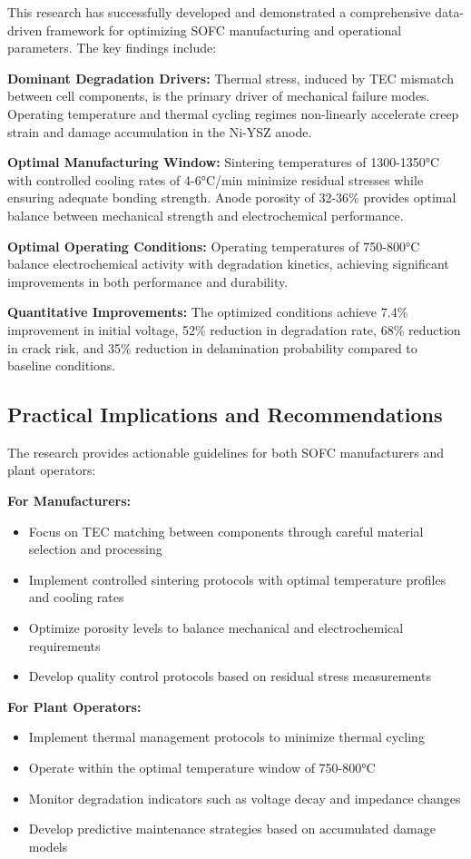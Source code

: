\documentclass[conference]{IEEEtran}
\begin{document}
This research has successfully developed and demonstrated a comprehensive data-driven framework for optimizing SOFC manufacturing and operational parameters. The key findings include:

\textbf{Dominant Degradation Drivers:} Thermal stress, induced by TEC mismatch between cell components, is the primary driver of mechanical failure modes. Operating temperature and thermal cycling regimes non-linearly accelerate creep strain and damage accumulation in the Ni-YSZ anode.

\textbf{Optimal Manufacturing Window:} Sintering temperatures of 1300-1350°C with controlled cooling rates of 4-6°C/min minimize residual stresses while ensuring adequate bonding strength. Anode porosity of 32-36\% provides optimal balance between mechanical strength and electrochemical performance.

\textbf{Optimal Operating Conditions:} Operating temperatures of 750-800°C balance electrochemical activity with degradation kinetics, achieving significant improvements in both performance and durability.

\textbf{Quantitative Improvements:} The optimized conditions achieve 7.4\% improvement in initial voltage, 52\% reduction in degradation rate, 68\% reduction in crack risk, and 35\% reduction in delamination probability compared to baseline conditions.

\subsection{Practical Implications and Recommendations}

The research provides actionable guidelines for both SOFC manufacturers and plant operators:

\textbf{For Manufacturers:}
\begin{itemize}
\item Focus on TEC matching between components through careful material selection and processing
\item Implement controlled sintering protocols with optimal temperature profiles and cooling rates
\item Optimize porosity levels to balance mechanical and electrochemical requirements
\item Develop quality control protocols based on residual stress measurements
\end{itemize}

\textbf{For Plant Operators:}
\begin{itemize}
\item Implement thermal management protocols to minimize thermal cycling
\item Operate within the optimal temperature window of 750-800°C
\item Monitor degradation indicators such as voltage decay and impedance changes
\item Develop predictive maintenance strategies based on accumulated damage models
\end{itemize}
\end{document}
